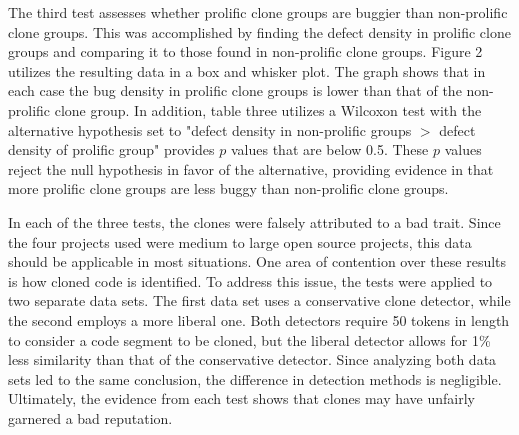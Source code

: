 \documentclass{article}
\begin{document}
The third test assesses whether prolific clone groups are buggier than non-prolific clone groups. This was accomplished by finding the defect density in prolific clone groups and comparing it to those found in non-prolific clone groups. Figure 2 utilizes the resulting data in a box and whisker plot. The graph shows that in each case the bug density in prolific clone groups is lower than that of the non-prolific clone group. In addition, table three utilizes a Wilcoxon test with the alternative hypothesis set to "defect density in non-prolific groups $>$ defect density of prolific group" provides $p$ values that are below 0.5. These $p$ values reject the null hypothesis in favor of the alternative, providing evidence in that more prolific clone groups are less buggy than non-prolific clone groups.

In each of the three tests, the clones were falsely attributed to a bad trait. Since the four projects used were medium to large open source projects, this data should be applicable in most situations. One area of contention over these results is how cloned code is identified. To address this issue, the tests were applied to two separate data sets. The first data set uses a conservative clone detector, while the second employs a more liberal one. Both detectors require 50 tokens in length to consider a code segment to be cloned, but the liberal detector allows for 1\% less similarity than that of the conservative detector. Since analyzing both data sets led to the same conclusion, the difference in detection methods is negligible. Ultimately, the evidence from each test shows that clones may have unfairly garnered a bad reputation.
\end{document}
